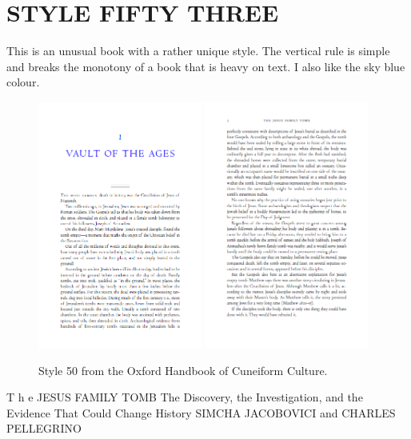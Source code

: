 \pagestyle{fancy}
\chapter{{STYLE FIFTY THREE}}


This is an unusual book with a rather unique style. The vertical rule is simple and breaks the monotony of a book that is heavy on text. I also like the sky blue colour.
\begin{figure}[ht]
\includegraphics[width=0.48\textwidth]{./chapters/chapter53}\hfill
\includegraphics[width=0.48\textwidth]{./chapters/chapter53a}
\caption{Style 50 from the Oxford Handbook of Cuneiform Culture.}
\end{figure}

T h e
JESUS
FAMILY
TOMB
The Discovery, the Investigation,
and the Evidence
That Could Change History
SIMCHA JACOBOVICI and CHARLES PELLEGRINO

